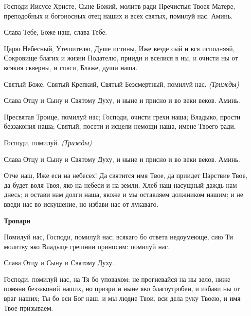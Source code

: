    Господи Иисусе Христе, Сыне Божий, молитв ради Пречистыя Твоея
Матере, преподобных и богоносных отец наших и всех святых, помилуй нас.
Аминь.



   Слава Тебе, Боже наш, слава Тебе.



   Царю Небесный, Утешителю, Душе истины, Иже везде сый и вся
исполняяй, Сокровище благих и жизни Подателю, прииди и вселися в ны, и
очисти ны от всякия скверны, и спаси, Блаже, души наша.



   Святый Боже, Святый Крепкий, Святый Безсмертный, помилуй нас.\itshape 
(Трижды)\normalfont{}



   Слава Отцу и Сыну и Святому Духу, и ныне и присно и во веки веков.
Аминь.



   Пресвятая Троице, помилуй нас; Господи, очисти грехи наша; Владыко,
прости беззакония наша; Святый, посети и исцели немощи наша, имене
Твоего ради.



   Господи, помилуй. \itshape  (Трижды)\normalfont{}



   Слава Отцу и Сыну и Святому Духу, и ныне и присно и во веки веков.
Аминь.



   Отче наш, Иже еси на небесех! Да святится имя Твое, да приидет
Царствие Твое, да будет воля Твоя, яко на небеси и на земли. Хлеб наш
насущный даждь нам днесь; и остави нам долги наша, якоже и мы оставляем
должником нашим; и не введи нас во искушение, но избави нас от
лукаваго.
   


 

\bfseries Тропари\normalfont{}


   Помилуй нас, Господи, помилуй нас; всякаго бо ответа недоумеюще, сию
Ти молитву яко Владыце грешнии приносим: помилуй нас.



   Слава Отцу и Сыну и Святому Духу.



   Господи, помилуй нас, на Тя бо уповахом; не прогневайся на ны зело,
ниже помяни беззаконий наших, но призри и ныне яко благоутробен, и
избави ны от враг наших; Ты бо еси Бог наш, и мы людие Твои, вси дела
руку Твоею, и имя Твое призываем.




